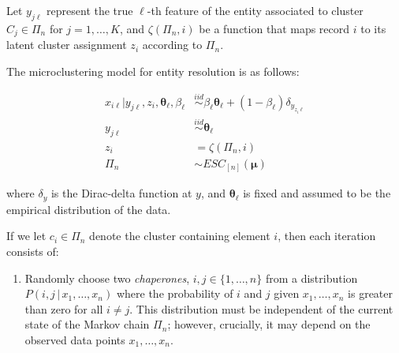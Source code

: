 \documentclass[portrait,a0b,final]{a0poster}
\newcommand{\g}{\,|\,}
\newcommand{\zed}{z_i}
\newcommand{\btheta}{\boldsymbol{\theta}}
\newenvironment{poster}{
  \begin{center}
  \begin{minipage}[c]{0.98\textwidth}
}{
  \end{minipage}
  \end{center}
}
\newcommand{\pbox}[4]{
\psshadowbox[#3]{
\begin{minipage}[t][#2][t]{#1}
#4
\end{minipage}
}}
\begin{document}
\begin{poster}
\begin{multicols}{3}
Let $y_{j\ell}$ represent the true $\ell$-th feature of the entity associated to cluster $C_j \in \Pi_n$ for $j=1,\ldots, K$, and  $\zeta(\Pi_{n}, i)$ be a function that maps record $i$ to its latent cluster assignment $z_i$ according to 
$\Pi_{n}$. 

The microclustering model for entity resolution is as follows: 
\begin{center}
\vspace*{-1em}
\begin{align}
x_{i\ell} | y_{j\ell}, \zed, \btheta_{\ell}, \beta_{\ell}  &\stackrel{iid}\sim \beta_{\ell}\btheta_{\ell} + (1-\beta_{\ell})\delta_{y_{z_i\ell}} \label{eq:x_giv_y}\\
y_{j\ell} & \stackrel{iid}{\sim} \btheta_{\ell}  \label{eq:y_gen} \\
\zed & = \zeta(\Pi_{n}, i)  \\
\Pi_n & \sim ESC_{[n]}(\bm{\mu})
\end{align}
\end{center}
where $\delta_{y}$ is the Dirac-delta function at $y$, and $\btheta_{\ell}$ is fixed and assumed to be the empirical distribution of the data.

\vspace*{1em}

\vspace{.25cm}\begin{center}\pbox{0.8\columnwidth}{}{linewidth=2mm,framearc=0.1,linecolor=lightblue,
fillstyle=gradient,gradangle=0,gradbegin=white,gradend=whiteblue,gradmidpoint=1.0,framesep=1em}
{\begin{center}{\large \bf Chaperones Algorithm}\end{center}}\end{center}\vspace{.3cm}
\vspace*{1em}

If we let $c_i \in \Pi_n$ denote the cluster containing
element $i$, then each iteration consists of: 
\begin{enumerate}[label=\textbf{\arabic*.}]
\item Randomly choose two \emph{chaperones}, $i, j \in \{1, \ldots,
  n\}$ from a distribution $P(i, j \g x_1, \ldots, x_n)$ where the
  probability of $i$ and $j$ given $x_1, \ldots, x_n$ is greater
  than zero for all $i \neq j$. This distribution must be
  independent of the current state of the Markov chain $\Pi_n$;
  however, crucially, it may depend on the observed data points
  $x_1, \ldots, x_n$.


\end{enumerate}
\end{multicols}
\end{poster}
\end{document}

